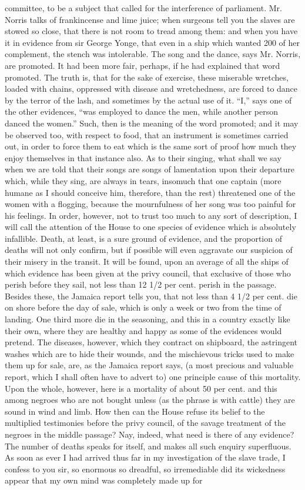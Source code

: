 \documentclass[a4paper]{amsbook}
\begin{document}
committee, to be a subject that called for the interference of parliament. Mr. Norris talks of frankincense and lime juice; when surgeons tell you the slaves are stowed so close, that there is not room to tread among them: and when you have it in evidence from sir George Yonge, that even in a ship which wanted 200 of her complement, the stench was intolerable. The song and the dance, says Mr. Norris, are promoted. It had been more fair, perhaps, if he had explained that word promoted. The truth is, that for the sake of exercise, these miserable wretches, loaded with chains, oppressed with disease and wretchedness, are forced to dance by the terror of the lash, and sometimes by the actual use of it. “I,” says one of the other evidences, “was employed to dance the men, while another person danced the women.” Such, then is the meaning of the word promoted; and it may be observed too, with respect to food, that an instrument is sometimes carried out, in order to force them to eat which is the same sort of proof how much they enjoy themselves in that instance also. As to their singing, what shall we say when we are told that their songs are songs of lamentation upon their departure which, while they sing, are always in tears, insomuch that one captain (more humane as I should conceive him, therefore, than the rest) threatened one of the women with a flogging, because the mournfulness of her song was too painful for his feelings. In order, however, not to trust too much to any sort of description, I will call the attention of the House to one species of evidence which is absolutely infallible. Death, at least, is a sure ground of evidence, and the proportion of deaths will not only confirm, but if possible will even aggravate our suspicion of their misery in the transit. It will be found, upon an average of all the ships of which evidence has been given at the privy council, that exclusive of those who perish before they sail, not less than 12 1/2 per cent. perish in the passage. Besides these, the Jamaica report tells you, that not less than 4 1/2 per cent. die on shore before the day of sale, which is only a week or two from the time of landing. One third more die in the seasoning, and this in a country exactly like their own, where they are healthy and happy as some of the evidences would pretend. The diseases, however, which they contract on shipboard, the astringent washes which are to hide their wounds, and the mischievous tricks used to make them up for sale, are, as the Jamaica report says, (a most precious and valuable report, which I shall often have to advert to) one principle cause of this mortality. Upon the whole, however, here is a mortality of about 50 per cent. and this among negroes who are not bought unless (as the phrase is with cattle) they are sound in wind and limb. How then can the House refuse its belief to the multiplied testimonies before the privy council, of the savage treatment of the negroes in the middle passage? Nay, indeed, what need is there of any evidence? The number of deaths speaks for itself, and makes all such enquiry superfluous. As soon as ever I had arrived thus far in my investigation of the slave trade, I confess to you sir, so enormous so dreadful, so irremediable did its wickedness appear that my own mind was completely made up for 
\end{document}
